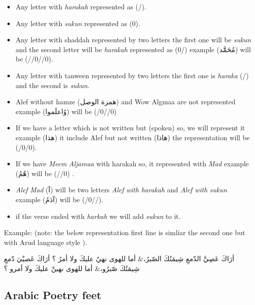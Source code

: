   \begin{itemize}
  \item Any letter with \textit{harakah} represented as (/).
  \item Any letter with \textit{sukun} represented as (0).
  \item Any letter with shaddah represented by two letters the first one will be \textit{sukun} and the second letter will be \textit{harakah} represented as (0/) example (\textarabic{مُحَمََّد}) will be (//0//0).
  \item Any letter with tanween represented by two letters the first one is \textit{haraka} (/) and the second is \textit{sukun}.
  \item Alef without hamze (\textarabic{همزة الوصل}) and Wow Algmaa are not represented example (\textarabic{وُاعلَموا}) will be (/0//0)
  \item If we have a letter which is not written but (spoken) so, we will represent it example (\textarabic{هذا}) it include Alef but not written (\textarabic{هاذا}) the representation will be (/0/0).
  \item If we have \textit{Meem Aljamaa} with harakah so, it represented with \textit{Mad} example (\textarabic{هُمُ}) will be (//0) .
  \item \textit{Alef Mad} (\textarabic{آ}) will be two letters \textit{Alef with harakah} and \textit{Alef with sukun} example (\textarabic{آدَمُ}) will be (/0//).
    \item if the verse ended with \textit{harkah} we will add \textit{sukun} to it.


    \end{itemize}
Example: (note: the below representation first line is simliar the second one but with Arud language style ).
\begin{Arabic}
  \begin{traditionalpoem*}
أرَاكَ عَصِيَّ الدّمعِ شِيمَتُكَ الصّبرُ،\quad & \quad أما للهوى نهيٌ عليكَ ولا أمرُ ؟
أرَاكَ عَصيْيَ دّمعِ شِيمَتُكَ صّبرُو،\quad & \quad أما للهوى نهينْ عليكَ ولا أمرو ؟
	\end{traditionalpoem*}
\end{Arabic}


\subsection{Arabic Poetry feet}

